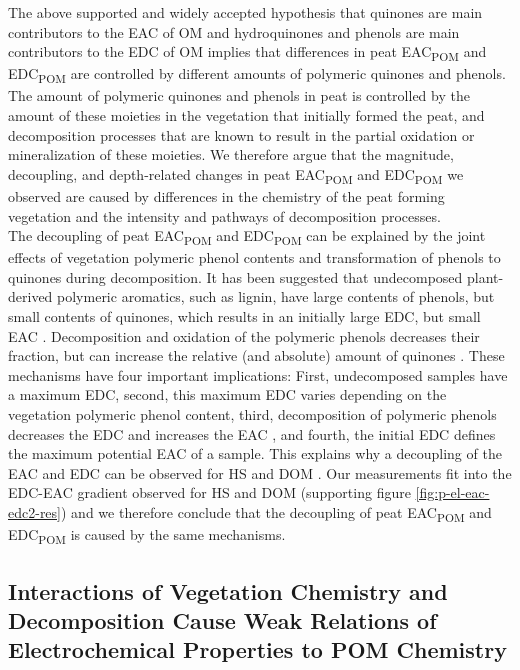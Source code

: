 \documentclass[alpha-refs]{wiley-article-rmd}
\begin{document}
\begin{refsection}
The above supported and widely accepted hypothesis that quinones are main contributors to the EAC of OM and hydroquinones and phenols are main contributors to the EDC of OM implies that differences in peat EAC\textsubscript{POM} and EDC\textsubscript{POM} are controlled by different amounts of polymeric quinones and phenols. The amount of polymeric quinones and phenols in peat is controlled by the amount of these moieties in the vegetation that initially formed the peat, and decomposition processes that are known to result in the partial oxidation or mineralization of these moieties. We therefore argue that the magnitude, decoupling, and depth-related changes in peat EAC\textsubscript{POM} and EDC\textsubscript{POM} we observed are caused by differences in the chemistry of the peat forming vegetation and the intensity and pathways of decomposition processes.\\
The decoupling of peat EAC\textsubscript{POM} and EDC\textsubscript{POM} can be explained by the joint effects of vegetation polymeric phenol contents and transformation of phenols to quinones during decomposition. It has been suggested that undecomposed plant-derived polymeric aromatics, such as lignin, have large contents of phenols, but small contents of quinones, which results in an initially large EDC, but small EAC \autocite{Aeschbacher.2012}. Decomposition and oxidation of the polymeric phenols decreases their fraction, but can increase the relative (and absolute) amount of quinones \autocite{Aeschbacher.2012,Bolton.2018,LaCroix.2020}. These mechanisms have four important implications: First, undecomposed samples have a maximum EDC, second, this maximum EDC varies depending on the vegetation polymeric phenol content, third, decomposition of polymeric phenols decreases the EDC and increases the EAC \autocite{Aeschbacher.2012}, and fourth, the initial EDC defines the maximum potential EAC of a sample. This explains why a decoupling of the EAC and EDC can be observed for HS and DOM \autocite{Aeschbacher.2012}. Our measurements fit into the EDC-EAC gradient observed for HS and DOM (supporting figure \ref{fig:p-el-eac-edc2-res}) and we therefore conclude that the decoupling of peat EAC\textsubscript{POM} and EDC\textsubscript{POM} is caused by the same mechanisms.

\hypertarget{interactions-of-vegetation-chemistry-and-decomposition-cause-weak-relations-of-electrochemical-properties-to-pom-chemistry}{%
\subsection{Interactions of Vegetation Chemistry and Decomposition Cause Weak Relations of Electrochemical Properties to POM Chemistry}\label{interactions-of-vegetation-chemistry-and-decomposition-cause-weak-relations-of-electrochemical-properties-to-pom-chemistry}}


\end{refsection}
\end{document}
